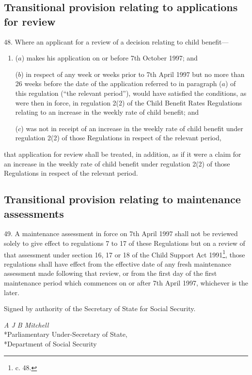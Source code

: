 \documentclass[a4paper]{article}
\begin{document}
\subsection[48. Transitional provision relating to applications for review]{Transitional provision relating to applications for review}

48.  Where an applicant for a review of a decision relating to child benefit—
\begin{enumerate}\item[]
($a$) makes his application on or before 7th October 1997; and

($b$) in respect of any week or weeks prior to 7th April 1997 but no more than 26 weeks before the date of the application referred to in paragraph ($a$) of this regulation (“the relevant period”), would have satisfied the conditions, as were then in force, in regulation 2(2) of the Child Benefit Rates Regulations relating to an increase in the weekly rate of child benefit; and

($c$) was not in receipt of an increase in the weekly rate of child benefit under regulation 2(2) of those Regulations in respect of the relevant period,
\end{enumerate}
that application for review shall be treated, in addition, as if it were a claim for an increase in the weekly rate of child benefit under regulation 2(2) of those Regulations in respect of the relevant period.

\subsection[49. Transitional provision relating to maintenance assessments]{Transitional provision relating to maintenance assessments}

49.  A maintenance assessment in force on 7th April 1997 shall not be reviewed solely to give effect to regulations 7 to 17 of these Regulations but on a review of that assessment under section 16, 17 or 18 of the Child Support Act 1991\footnote{ c. 48.}, those regulations shall have effect from the effective date of any fresh maintenance assessment made following that review, or from the first day of the first maintenance period which commences on or after 7th April 1997, whichever is the later.

\bigskip

Signed by authority of the Secretary of State for Social Security.

{\raggedleft
\emph{A J B Mitchell}\\*Parliamentary Under-Secretary of State,\\*Department of Social Security

}
\end{document}
